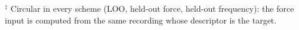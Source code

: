$^\ddagger$ Circular in every scheme (LOO, held-out force, held-out frequency): the force input is computed from the same recording whose descriptor is the target.

